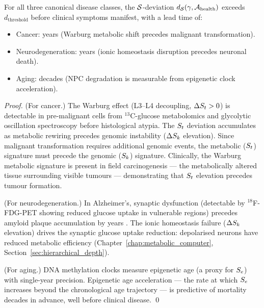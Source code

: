 \begin{theorem}
\label{thm:sspace_predictive}
For all three canonical disease classes, the $\mathcal{S}$-deviation
$d_{\mathcal{S}}(\gamma, \mathcal{A}_{\mathrm{health}})$ exceeds $d_{\mathrm{threshold}}$
before clinical symptoms manifest, with a lead time of:
\begin{itemize}
  \item Cancer: years (Warburg metabolic shift precedes malignant transformation).
  \item Neurodegeneration: years (ionic homeostasis disruption precedes
        neuronal death).
  \item Aging: decades (NPC degradation is measurable from epigenetic
        clock acceleration).
\end{itemize}
\end{theorem}

\begin{proof}
(For cancer.) The Warburg effect (L3--L4 decoupling, $\Delta S_t > 0$) is
detectable in pre-malignant cells from $^{13}$C-glucose metabolomics and
glycolytic oscillation spectroscopy before histological atypia. The
$S_t$ deviation accumulates as metabolic rewiring precedes genomic instability
($\Delta S_k$ elevation). Since malignant transformation requires additional
genomic events, the metabolic ($S_t$) signature must precede the genomic
($S_k$) signature. Clinically, the Warburg metabolic signature is present in
field carcinogenesis --- the metabolically altered tissue surrounding visible
tumours --- demonstrating that $S_t$ elevation precedes tumour formation.

(For neurodegeneration.) In Alzheimer's, synaptic dysfunction (detectable
by $^{18}$F-FDG-PET showing reduced glucose uptake in vulnerable regions)
precedes amyloid plaque accumulation by years \citep{Jack2013}. The ionic
homeostasis failure ($\Delta S_k$ elevation) drives the synaptic glucose
uptake reduction: depolarised neurons have reduced metabolic efficiency
(Chapter~\ref{chap:metabolic_computer}, Section~\ref{sec:hierarchical_depth}).

(For aging.) DNA methylation clocks \citep{Horvath2013} measure epigenetic
age (a proxy for $S_e$) with single-year precision. Epigenetic age
acceleration --- the rate at which $S_e$ increases beyond the chronological
age trajectory --- is predictive of mortality decades in advance, well before
clinical disease. \qed
\end{proof}

